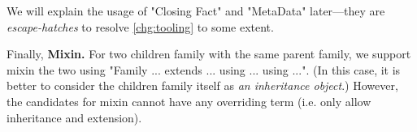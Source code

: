 
We will explain the usage of "Closing Fact" and "MetaData" later---they are \textit{escape-hatches} to resolve \ref{chg:tooling} to some extent.



Finally, \textbf{Mixin.} For two children family with the same parent family, we support mixin the two using "Family ... extends ... using ... using ...". (In this case, it is better to consider the children family itself as \textit{an inheritance object}.) However, the candidates for mixin cannot have any overriding term (i.e. only allow inheritance and extension).  

\fi